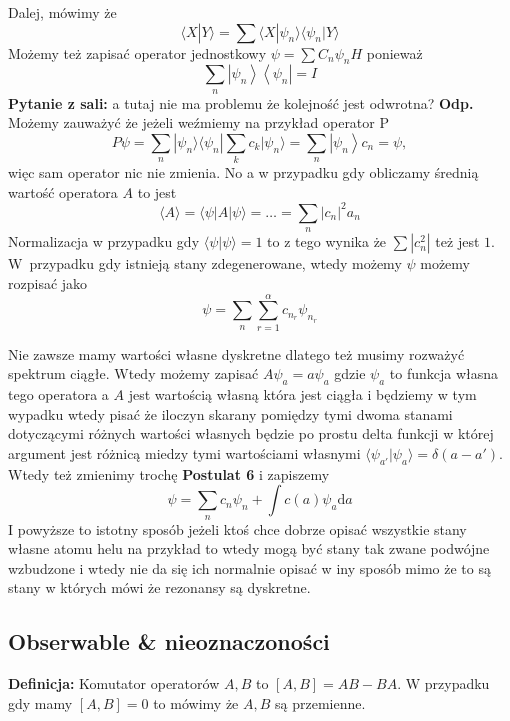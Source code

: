 Dalej, mówimy że 
\begin{equation*}
	\langle X | Y \rangle = \sum \langle X | \psi_n \rangle \langle \psi_n | Y \rangle
\end{equation*}
Możemy też zapisać operator jednostkowy $ \psi=\sum C_{n} \psi_{n} H $ ponieważ
\begin{equation*}
	\sum_{n}\left|\psi_{n}\right\rangle\left\langle\psi_{n}\right|=I 
\end{equation*}
\textbf{Pytanie z sali:} a tutaj nie ma problemu że kolejność jest odwrotna? \textbf{Odp.} Możemy zauważyć że jeżeli weźmiemy na przykład operator P
\begin{equation*}
	P \psi=\sum_{n} |\psi_{n} \rangle \langle \psi_{n} | \sum_{k} c_{k} |\psi_{n} \rangle  =\sum_{n}\left|\psi_{n}\right\rangle c_{n}=\psi,
\end{equation*}
więc sam operator nic nie zmienia.
No a w przypadku gdy obliczamy średnią wartość operatora $A$ to jest 
\begin{equation*}
	\langle A\rangle=\langle\psi| A|\psi\rangle= \dotsc = \sum_{n}\left|c_{n}\right|^{2} a_{n}
\end{equation*}
Normalizacja w przypadku gdy $\langle \psi | \psi \rangle = 1$ to z tego wynika że $\sum |c_n^2|$ też jest $1$.
W~przypadku gdy istnieją stany zdegenerowane, wtedy możemy $\psi$ możemy rozpisać jako 
\begin{equation*}
	\psi = \sum_n \sum_{r=1}^{\alpha} c_{n_r} \psi_{n_r}
\end{equation*}

Nie zawsze mamy wartości własne dyskretne dlatego też musimy rozważyć spektrum ciągłe. Wtedy możemy zapisać $A \psi_a = a \psi_a$ gdzie $\psi_a$ to funkcja własna tego operatora a $A$ jest wartością własną która jest ciągła i będziemy w tym wypadku wtedy pisać że iloczyn skarany pomiędzy tymi dwoma stanami dotyczącymi różnych wartości własnych będzie po prostu delta funkcji w której argument jest różnicą miedzy tymi wartościami własnymi $\langle \psi_{a'} | \psi_a  \rangle = \delta(a - a')$.
Wtedy też zmienimy trochę \textbf{Postulat 6} i zapiszemy
\begin{equation*}
	\psi = \sum_n c_n \psi_n + \int c(a) \psi_a \text{d}a
\end{equation*}
I powyższe to istotny sposób jeżeli ktoś chce dobrze opisać wszystkie stany własne atomu helu na przykład to wtedy mogą być stany tak zwane podwójne wzbudzone i wtedy nie da się ich normalnie opisać w iny sposób mimo że to są stany w których mówi że rezonansy są dyskretne.
\subsection{Obserwable \& nieoznaczoności}
\textbf{Definicja:} Komutator operatorów $A, B$ to $[A, B] = AB - BA$.
W przypadku gdy mamy $[A, B] = 0$ to mówimy że $A, B$ są przemienne.

